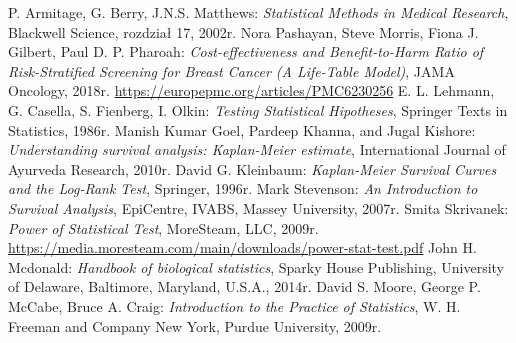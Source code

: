 \documentclass[licencjacka]{pwr_wmat_praca_dyplomowa}
\theoremstyle{plain}
\numberwithin{theorem}{chapter}
\theoremstyle{definition}
\numberwithin{theorem}{chapter}
\begin{document}
\begin{thebibliography}{99}
	 P. Armitage, G. Berry, J.N.S. Matthews:
	\emph{Statistical Methods in Medical Research},
	Blackwell Science, rozdział 17, 2002r.
	 Nora Pashayan, Steve Morris, Fiona J. Gilbert, Paul D. P. Pharoah:
	\emph{Cost-effectiveness and Benefit-to-Harm Ratio of Risk-Stratified Screening for Breast Cancer (A Life-Table Model)}, JAMA Oncology, 2018r. \url{https://europepmc.org/articles/PMC6230256}
	 E. L. Lehmann, G. Casella, S. Fienberg, I. Olkin:
	\emph{Testing Statistical Hipotheses}, Springer Texts in Statistics, 1986r.
	 Manish Kumar Goel, Pardeep Khanna, and Jugal Kishore:
	\emph{Understanding survival analysis: Kaplan-Meier estimate}, International Journal of Ayurveda Research, 2010r.
	 David G. Kleinbaum:
	\emph{Kaplan-Meier Survival Curves and the Log-Rank Test}, Springer, 1996r.
	 Mark Stevenson:
	\emph{An Introduction to Survival Analysis}, EpiCentre, IVABS, Massey University, 2007r.
	 Smita Skrivanek:
	\emph{Power of Statistical  Test}, MoreSteam, LLC, 2009r.
	\url{https://media.moresteam.com/main/downloads/power-stat-test.pdf}
	 John H. Mcdonald:
	\emph{Handbook of biological statistics}, Sparky House Publishing, University of Delaware, Baltimore, Maryland, U.S.A., 2014r.
	 David S. Moore, George P. McCabe, Bruce A. Craig:
	\emph{Introduction to the Practice of Statistics}, W. H. Freeman and Company	New York, Purdue University, 2009r.
	
\end{thebibliography}
\end{document}
